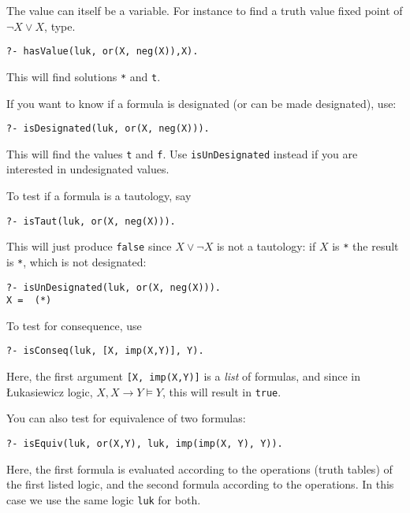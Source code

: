 \documentclass[]{article}
\newcommand{\passthrough}[1]{#1}
\begin{document}
The value can itself be a variable. For instance to find a truth value
fixed point of \(\lnot X \lor X\), type.

\begin{lstlisting}
?- hasValue(luk, or(X, neg(X)),X).
\end{lstlisting}

This will find solutions \passthrough{\lstinline!*!} and
\passthrough{\lstinline!t!}.

If you want to know if a formula is designated (or can be made
designated), use:

\begin{lstlisting}
?- isDesignated(luk, or(X, neg(X))).
\end{lstlisting}

This will find the values \passthrough{\lstinline!t!} and
\passthrough{\lstinline!f!}. Use
\passthrough{\lstinline!isUnDesignated!} instead if you are interested
in undesignated values.

To test if a formula is a tautology, say

\begin{lstlisting}
?- isTaut(luk, or(X, neg(X))).
\end{lstlisting}

This will just produce \passthrough{\lstinline!false!} since
\(X \lor \lnot X\) is not a tautology: if \(X\) is
\passthrough{\lstinline!*!} the result is \passthrough{\lstinline!*!},
which is not designated:

\begin{lstlisting}
?- isUnDesignated(luk, or(X, neg(X))).
X =  (*) 
\end{lstlisting}

To test for consequence, use

\begin{lstlisting}
?- isConseq(luk, [X, imp(X,Y)], Y).
\end{lstlisting}

Here, the first argument \passthrough{\lstinline![X, imp(X,Y)]!} is a
\emph{list} of formulas, and since in Łukasiewicz logic,
\(X, X \to Y \models Y\), this will result in
\passthrough{\lstinline!true!}.

You can also test for equivalence of two formulas:

\begin{lstlisting}
?- isEquiv(luk, or(X,Y), luk, imp(imp(X, Y), Y)).
\end{lstlisting}

Here, the first formula is evaluated according to the operations (truth
tables) of the first listed logic, and the second formula according to
the operations. In this case we use the same logic
\passthrough{\lstinline!luk!} for both.
\end{document}
